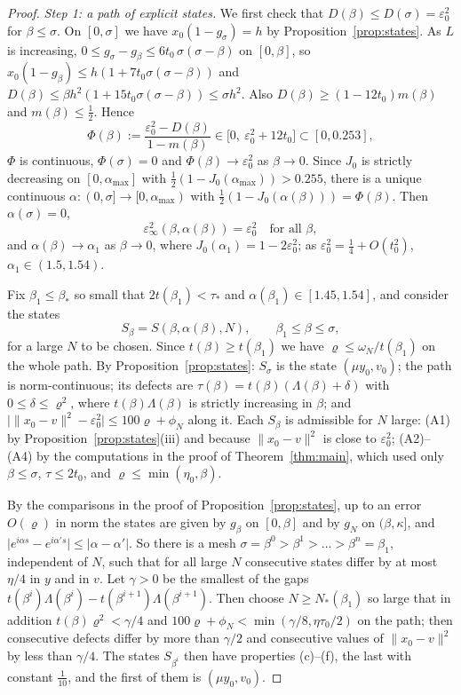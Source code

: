 \documentclass[11pt]{article}
\theoremstyle{definition}
\newcommand{\norm}[1]{\lVert #1\rVert}
\newcommand{\abs}[1]{\lvert #1\rvert}
\newcommand{\rhoN}{\varrho}
\begin{document}
\begin{proof}
\emph{Step 1: a path of explicit states.} We first check that $D(\beta)\le D(\sigma)
=\varepsilon_0^2$ for $\beta\le\sigma$. On $[0,\sigma]$ we have $x_0(1-g_\sigma)=h$ by
Proposition~\ref{prop:states}. As $L$ is increasing, $0\le g_\sigma-g_\beta\le
6t_0\,\sigma(\sigma-\beta)$ on $[0,\beta]$, so $x_0(1-g_\beta)\le h(1+7t_0\sigma(\sigma-\beta))$
and $D(\beta)\le\beta h^2(1+15t_0\sigma(\sigma-\beta))\le\sigma h^2$. Also
$D(\beta)\ge(1-12t_0)m(\beta)$ and $m(\beta)\le\frac12$. Hence
\[
\Phi(\beta):=\frac{\varepsilon_0^2-D(\beta)}{1-m(\beta)}\in\bigl[0,\ \varepsilon_0^2+12t_0\bigr]
\subset[0,0.253],
\]
$\Phi$ is continuous, $\Phi(\sigma)=0$ and $\Phi(\beta)\to\varepsilon_0^2$ as $\beta\to0$.
Since $J_0$ is strictly decreasing on $[0,\alpha_{\max}]$ with
$\frac12(1-J_0(\alpha_{\max}))>0.255$, there is a unique continuous
$\alpha:(0,\sigma]\to[0,\alpha_{\max})$ with
$\frac12(1-J_0(\alpha(\beta)))=\Phi(\beta)$. Then $\alpha(\sigma)=0$,
\[
\varepsilon_\infty^2(\beta,\alpha(\beta))=\varepsilon_0^2\quad\text{for all }\beta ,
\]
and $\alpha(\beta)\to\alpha_1$ as $\beta\to0$, where $J_0(\alpha_1)=1-2\varepsilon_0^2$; as
$\varepsilon_0^2=\frac14+O(t_0^2)$, $\alpha_1\in(1.5,1.54)$.

Fix $\beta_1\le\beta_*$ so small that $2t(\beta_1)<\tau_*$ and
$\alpha(\beta_1)\in[1.45,1.54]$, and consider the states
\[
S_\beta=S(\beta,\alpha(\beta),N),\qquad\beta_1\le\beta\le\sigma ,
\]
for a large $N$ to be chosen. Since $t(\beta)\ge t(\beta_1)$ we have
$\rhoN\le\omega_N/t(\beta_1)$ on the whole path. By Proposition~\ref{prop:states}: $S_\sigma$
is the state $(\mu y_0,v_0)$; the path is norm-continuous; its defects are
$\tau(\beta)=t(\beta)(\Lambda(\beta)+\delta)$ with $0\le\delta\le\rhoN^2$, where
$t(\beta)\Lambda(\beta)$ is strictly increasing in $\beta$; and
$\bigl|\norm{x_0-v}^2-\varepsilon_0^2\bigr|\le100\rhoN+\phi_N$ along it. Each $S_\beta$ is
admissible for $N$ large: (A1) by Proposition~\ref{prop:states}(iii) and because
$\norm{x_0-v}^2$ is close to $\varepsilon_0^2$; (A2)--(A4) by the computations in the proof of
Theorem~\ref{thm:main}, which used only $\beta\le\sigma$, $\tau\le2t_0$, and
$\rhoN\le\min(\eta_0,\beta)$.

By the comparisons in the proof of Proposition~\ref{prop:states}, up to an error $O(\rhoN)$
in norm the states are given by $g_\beta$ on $[0,\beta]$ and by $g_N$ on $(\beta,\kappa]$, and
$\abs{e^{i\alpha s}-e^{i\alpha's}}\le\abs{\alpha-\alpha'}$. So there is a mesh
$\sigma=\beta^0>\beta^1>\dots>\beta^n=\beta_1$, independent of $N$, such that for all large
$N$ consecutive states differ by at most $\eta/4$ in $y$ and in $v$. Let $\gamma>0$ be the
smallest of the gaps $t(\beta^i)\Lambda(\beta^i)-t(\beta^{i+1})\Lambda(\beta^{i+1})$. Then
choose $N\ge N_*(\beta_1)$ so large that in addition $t(\beta)\rhoN^2<\gamma/4$ and
$100\rhoN+\phi_N<\min(\gamma/8,\eta\tau_0/2)$ on the path; then consecutive defects differ by
more than $\gamma/2$ and consecutive values of $\norm{x_0-v}^2$ by less than $\gamma/4$. The states $S_{\beta^i}$ then have properties (c)--(f), the last
with constant $\frac1{10}$, and the first of them is $(\mu y_0,v_0)$.


\end{proof}
\end{document}
